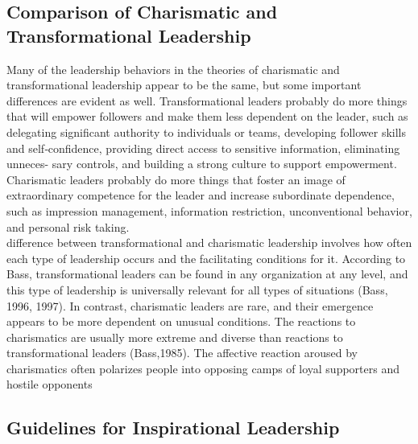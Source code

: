 \subsection{Comparison of Charismatic and Transformational Leadership} %
\label{sub:comparison_of_charismatic_and_transformational_leadership}
	Many of the leadership behaviors in the theories of charismatic and transformational leadership appear to be the same, but some important differences are evident as well. Transformational leaders probably do more things that will empower followers and make them less dependent on the leader, such as delegating significant authority to individuals or teams, developing follower skills and self‐confidence, providing direct access to sensitive information, eliminating unneces- sary controls, and building a strong culture to support empowerment. Charismatic leaders probably do more things that foster an image of extraordinary competence for the leader and increase subordinate dependence, such as impression management, information restriction, unconventional behavior, and personal risk taking.
	\\difference between transformational and charismatic leadership involves how often each type of leadership occurs and the facilitating conditions for it. According to Bass, transformational leaders can be found in any organization at any level, and this type of leadership is universally relevant for all types of situations (Bass, 1996, 1997). In contrast, charismatic leaders are rare, and their emergence appears to be more dependent on unusual conditions. The reactions to charismatics are usually more extreme and diverse than reactions to transformational leaders (Bass,1985). The affective reaction aroused by charismatics often polarizes people into opposing camps of loyal supporters and hostile opponents

\subsection{Guidelines for Inspirational Leadership} %
\label{sub:guidelines_for_inspirational_leadership}

